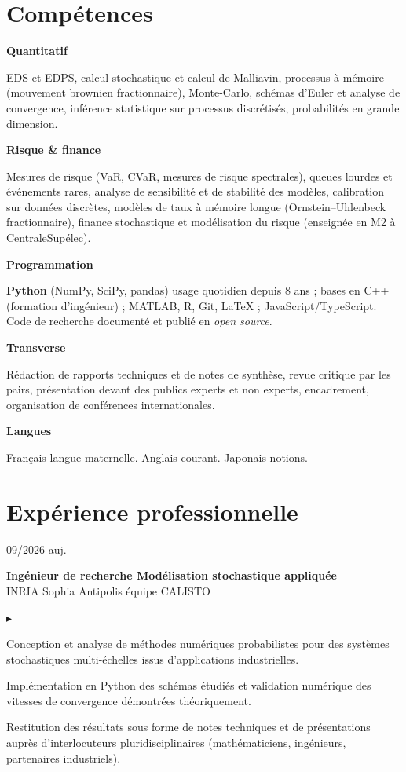 \documentclass[10pt,a4paper]{article}
\newlength{\datecol}\setlength{\datecol}{0.165\textwidth}
\newlength{\gutter}\setlength{\gutter}{1em}
\newlength{\bodycol}
\newcommand{\entry}[3]{%
  \par\vspace{1.0ex plus 0.9ex minus 0.1ex}\noindent
  \begin{minipage}[t]{\datecol}
    \vspace{0pt}\raggedright\small\color{muted}#1
  \end{minipage}%
  \hspace{\gutter}%
  \begin{minipage}[t]{\bodycol}
    \vspace{0pt}\raggedright
    {\headingfont\bfseries\small #2}\\[0.15ex]
    {\small\color{accent}#3}
  \end{minipage}%
  \par\vspace{0.3ex}
}
\newenvironment{bullets}
  {\begin{list}{\textcolor{accent}{\scriptsize$\blacktriangleright$}}{%
      \setlength{\leftmargin}{\datecol}
      \addtolength{\leftmargin}{\gutter}
      \addtolength{\leftmargin}{1.25em}
      \setlength{\rightmargin}{0pt}
      \setlength{\labelwidth}{0.9em}
      \setlength{\labelsep}{0.35em}
      \setlength{\itemsep}{0.2ex}
      \setlength{\parsep}{0pt}
      \setlength{\topsep}{0.4ex}
      \setlength{\partopsep}{0pt}
      \small}}
  {\end{list}}
\newcommand{\skillrow}[2]{%
  \par\noindent
  \begin{minipage}[t]{\datecol}
    \vspace{0pt}\raggedright{\headingfont\bfseries\footnotesize #1}
  \end{minipage}%
  \hspace{\gutter}%
  \begin{minipage}[t]{\bodycol}
    \vspace{0pt}\raggedright\small #2
  \end{minipage}%
  \par\vspace{0.7ex}
}
\newcommand{\cpp}{\mbox{C++}}
\begin{document}
\section{Compétences}
\skillrow{Quantitatif}{EDS et EDPS, calcul stochastique et calcul de Malliavin, processus à mémoire
(mouvement brownien fractionnaire), Monte-Carlo, schémas d'Euler et analyse de convergence, inférence
statistique sur processus discrétisés, probabilités en grande dimension.}
\skillrow{Risque \& finance}{Mesures de risque (VaR, CVaR, mesures de risque spectrales), queues lourdes et
événements rares, analyse de sensibilité et de stabilité des modèles, calibration sur données discrètes,
modèles de taux à mémoire longue (Ornstein--Uhlenbeck fractionnaire), finance stochastique et
modélisation du risque (enseignée en M2 à CentraleSupélec).}
\skillrow{Programmation}{\textbf{Python} (NumPy, SciPy, pandas) \textemdash{} usage quotidien depuis 8 ans ;
bases en \cpp{} (formation d'ingénieur) ; MATLAB, R, Git, \LaTeX{} ; JavaScript/TypeScript. Code de
recherche documenté et publié en \emph{open source}.}
\skillrow{Transverse}{Rédaction de rapports techniques et de notes de synthèse, revue critique par les pairs,
présentation devant des publics experts et non experts, encadrement, organisation de conférences
internationales.}
\skillrow{Langues}{Français \textemdash{} langue maternelle. Anglais \textemdash{} courant. Japonais \textemdash{} notions.}

\section{Expérience professionnelle}

\entry{09/2026 \textemdash{} auj.}{Ingénieur de recherche \textemdash{} Modélisation stochastique appliquée}{INRIA Sophia Antipolis \textemdash{} équipe CALISTO}
\begin{bullets}
  \item Conception et analyse de méthodes numériques probabilistes pour des systèmes stochastiques
  multi-échelles issus d'applications industrielles.
  \item Implémentation en Python des schémas étudiés et validation numérique des vitesses de convergence
  démontrées théoriquement.
  \item Restitution des résultats sous forme de notes techniques et de présentations auprès d'interlocuteurs
  pluridisciplinaires (mathématiciens, ingénieurs, partenaires industriels).
\end{bullets}
\end{document}
